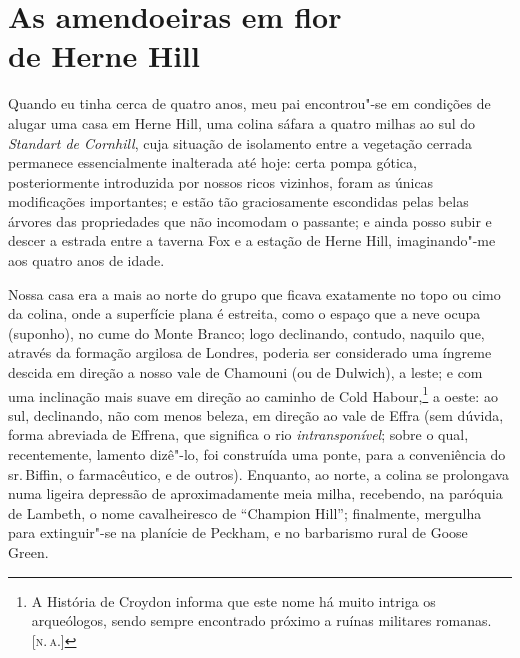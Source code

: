 \chapter*{As amendoeiras em flor\\de Herne Hill} %

Quando eu tinha cerca de quatro anos, meu pai encontrou"-se em
condições de alugar uma casa em Herne Hill, uma colina sáfara a quatro
milhas ao sul do \textit{Standart de Cornhill}, cuja situação de isolamento
entre a vegetação cerrada permanece essencialmente inalterada até hoje:
certa pompa gótica, posteriormente introduzida por nossos ricos
vizinhos, foram as únicas modificações importantes; e estão tão
graciosamente escondidas pelas belas árvores das propriedades que não
incomodam o passante; e ainda posso subir e descer a estrada entre a
taverna Fox e a estação de Herne Hill, imaginando"-me aos quatro anos de
idade.

Nossa casa era a mais ao norte do grupo que ficava exatamente no
topo ou cimo da colina, onde a superfície plana é estreita, como o
espaço que a neve ocupa (suponho), no cume do Monte Branco; logo
declinando, contudo, naquilo que, através da formação argilosa de
Londres, poderia ser considerado uma íngreme descida em direção a nosso
vale de Chamouni (ou de Dulwich), a leste; e com uma inclinação mais
suave em direção ao caminho de Cold Habour,\footnote{A História de
  Croydon informa que este nome há muito intriga os arqueólogos, sendo
  sempre encontrado próximo a ruínas militares romanas. {[}\textsc{n.\,a.}{]}}
a oeste: ao sul, declinando, não com menos beleza, em direção ao vale de
Effra (sem dúvida, forma abreviada de Effrena, que significa o rio
\textit{intransponível}; sobre o qual, recentemente, lamento dizê"-lo, foi
construída uma ponte, para a conveniência do sr.\,Biffin, o farmacêutico,
e de outros). Enquanto, ao norte, a colina se prolongava numa ligeira
depressão de aproximadamente meia milha, recebendo, na paróquia de
Lambeth, o nome cavalheiresco de ``Champion Hill''; finalmente, mergulha
para extinguir"-se na planície de Peckham, e no barbarismo rural de Goose
Green.

